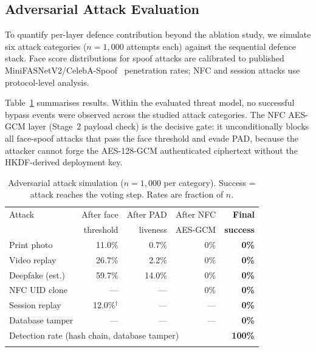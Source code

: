 \documentclass[pdflatex,sn-mathphys-num]{sn-jnl}%
\theoremstyle{thmstyleone}%
\theoremstyle{thmstyletwo}%
\theoremstyle{thmstylethree}%
\begin{document}
\subsection{Adversarial Attack Evaluation}\label{sec:adversarial}

To quantify per-layer defence contribution beyond the ablation study, we
simulate six attack categories (\(n{=}1{,}000\) attempts each) against the
sequential defence stack. Face score distributions for spoof attacks are
calibrated to published MiniFASNetV2/CelebA-Spoof~\cite{zhang2020minifasnet}
penetration rates; NFC and session attacks use protocol-level analysis.

Table~\ref{tab:adversarial} summarises results. Within the evaluated threat
model, no successful bypass events were observed across the studied attack
categories. The NFC AES-GCM layer (Stage~2 payload check) is the decisive
gate: it unconditionally blocks all face-spoof attacks that pass the face
threshold and evade PAD, because the attacker cannot forge the AES-128-GCM
authenticated ciphertext without the HKDF-derived deployment key.

\begin{table}[t]
\caption{Adversarial attack simulation (\(n{=}1{,}000\) per category).
  Success = attack reaches the voting step. Rates are fraction of \(n\).}
\label{tab:adversarial}%
\begin{tabular}{@{}lrrrr@{}}
  \toprule
  Attack & After face & After PAD & After NFC & \textbf{Final} \\
         & threshold  & liveness  & AES-GCM   & \textbf{success} \\
  \midrule
  Print photo      & 11.0\% & 0.7\%  & 0\% & \textbf{0\%} \\
  Video replay     & 26.7\% & 2.2\%  & 0\% & \textbf{0\%} \\
  Deepfake (est.)  & 59.7\% & 14.0\% & 0\% & \textbf{0\%} \\
  NFC UID clone    & ---    & ---    & 0\% & \textbf{0\%} \\
  Session replay   & 12.0\%$^\dagger$ & --- & --- & \textbf{0\%} \\
  Database tamper  & ---    & ---    & --- & \textbf{0\%} \\
  \midrule
  \multicolumn{4}{l}{Detection rate (hash chain, database tamper)} & \textbf{100\%} \\
  \botrule
\end{tabular}
\end{table}
\end{document}
